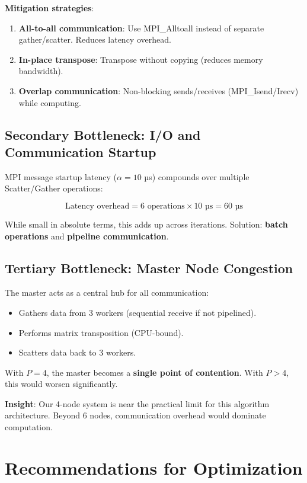 \documentclass[11pt,a4paper]{article}
\begin{document}
\textbf{Mitigation strategies}:
\begin{enumerate}
    \item \textbf{All-to-all communication}: Use MPI\_Alltoall instead of separate gather/scatter. Reduces latency overhead.
    \item \textbf{In-place transpose}: Transpose without copying (reduces memory bandwidth).
    \item \textbf{Overlap communication}: Non-blocking sends/receives (MPI\_Isend/Irecv) while computing.
\end{enumerate}

\subsection{Secondary Bottleneck: I/O and Communication Startup}

MPI message startup latency ($\alpha = 10$ µs) compounds over multiple Scatter/Gather operations:

\[
\text{Latency overhead} = 6 \text{ operations} \times 10 \text{ µs} = 60 \text{ µs}
\]

While small in absolute terms, this adds up across iterations. Solution: \textbf{batch operations} and \textbf{pipeline communication}.

\subsection{Tertiary Bottleneck: Master Node Congestion}

The master acts as a central hub for all communication:
\begin{itemize}
    \item Gathers data from 3 workers (sequential receive if not pipelined).
    \item Performs matrix transposition (CPU-bound).
    \item Scatters data back to 3 workers.
\end{itemize}

With $P=4$, the master becomes a \textbf{single point of contention}. With $P > 4$, this would worsen significantly.

\textbf{Insight}: Our 4-node system is near the practical limit for this algorithm architecture. Beyond 6 nodes, communication overhead would dominate computation.

\section{Recommendations for Optimization}
\end{document}
